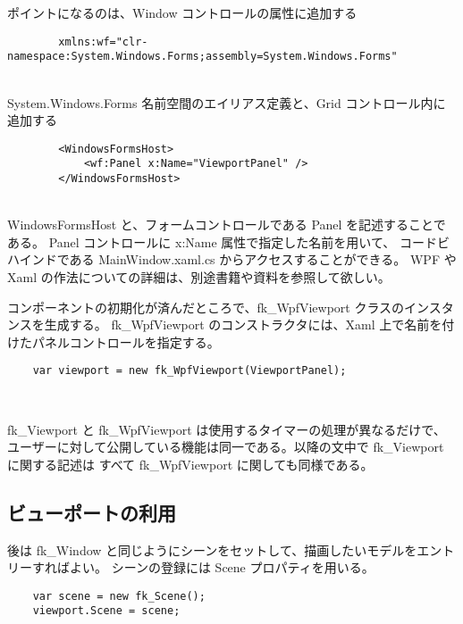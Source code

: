 ポイントになるのは、Window コントロールの属性に追加する
\\
\begin{screen}
\begin{verbatim}
        xmlns:wf="clr-namespace:System.Windows.Forms;assembly=System.Windows.Forms"
\end{verbatim}
\end{screen}
~ \\
System.Windows.Forms 名前空間のエイリアス定義と、Grid コントロール内に追加する
\\
\begin{screen}
\begin{verbatim}
        <WindowsFormsHost>
            <wf:Panel x:Name="ViewportPanel" />
        </WindowsFormsHost>
\end{verbatim}
\end{screen}
~ \\
WindowsFormsHost と、フォームコントロールである Panel を記述することである。
Panel コントロールに x:Name 属性で指定した名前を用いて、
コードビハインドである MainWindow.xaml.cs からアクセスすることができる。
WPF や Xaml の作法についての詳細は、別途書籍や資料を参照して欲しい。

コンポーネントの初期化が済んだところで、fk\_WpfViewport クラスのインスタンスを生成する。
fk\_WpfViewport のコンストラクタには、Xaml 上で名前を付けたパネルコントロールを指定する。
\\
\begin{screen}
\begin{verbatim}
    var viewport = new fk_WpfViewport(ViewportPanel);
\end{verbatim}
\end{screen}
~

fk\_Viewport と fk\_WpfViewport は使用するタイマーの処理が異なるだけで、
ユーザーに対して公開している機能は同一である。以降の文中で fk\_Viewport に関する記述は
すべて fk\_WpfViewport に関しても同様である。

\subsection{ビューポートの利用}

後は fk\_Window と同じようにシーンをセットして、描画したいモデルをエントリーすればよい。
シーンの登録には Scene プロパティを用いる。
\\
\begin{screen}
\begin{verbatim}
    var scene = new fk_Scene();
    viewport.Scene = scene;
\end{verbatim}
\end{screen}
~


